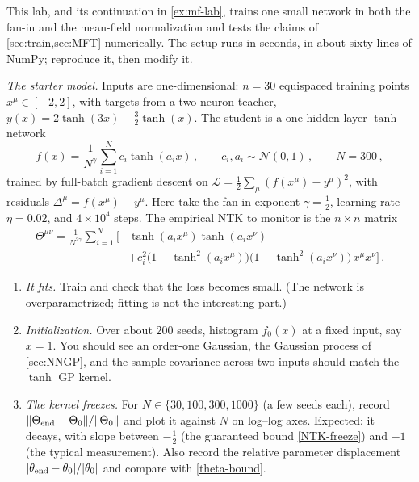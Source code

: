 \documentclass[11pt]{article}
\newcommand{\CN}{{\mathcal N}}
\newcommand{\CL}{{\mathcal L}}
\begin{document}
\begin{exercise}
\label{ex:ntk-lab}
\important
This lab, and its continuation in \cref{ex:mf-lab}, trains one small network in both the fan-in and the mean-field normalization and tests the claims of \cref{sec:train,sec:MFT} numerically. The setup runs in seconds, in about sixty lines of NumPy; reproduce it, then modify it.

\emph{The starter model.} Inputs are one-dimensional: $n=30$ equispaced training points $x^\mu\in[-2,2]$, with targets from a two-neuron teacher, $y(x) = 2\tanh(3x) - \frac{3}{2}\tanh(x)$. The student is a one-hidden-layer $\tanh$ network
%
\begin{equation} \label{lab-student}
    f(x) = \frac{1}{N^\gamma}\sum_{i=1}^N c_i\tanh(a_ix)\,,\qquad c_i,a_i\sim\CN(0,1)\,,\qquad N=300\,,
\end{equation}
%
trained by full-batch gradient descent on $\CL = \frac{1}{2}\sum_\mu(f(x^\mu)-y^\mu)^2$, with residuals $\Delta^\mu = f(x^\mu)-y^\mu$. Here take the fan-in exponent $\gamma = \frac{1}{2}$, learning rate $\eta = 0.02$, and $4\times10^4$ steps. The empirical NTK to monitor is the $n\times n$ matrix
%
\begin{equation} \label{lab-ntk}
    \begin{aligned}
    \Theta^{\mu\nu} = \frac{1}{N^{2\gamma}}\sum_{i=1}^N\Big[&\tanh(a_ix^\mu)\tanh(a_ix^\nu) \\ &+ c_i^2\big(1-\tanh^2(a_ix^\mu)\big)\big(1-\tanh^2(a_ix^\nu)\big)\,x^\mu x^\nu\Big]\,.
    \end{aligned}
\end{equation}
\begin{enumerate}
    \item \emph{It fits.} Train and check that the loss becomes small. (The network is overparametrized; fitting is not the interesting part.)
    \item \emph{Initialization.} Over about $200$ seeds, histogram $f_0(x)$ at a fixed input, say $x=1$. You should see an order-one Gaussian, the Gaussian process of \cref{sec:NNGP}, and the sample covariance across two inputs should match the $\tanh$ GP kernel.
    \item\label{ex:ntk-lab-freeze} \emph{The kernel freezes.} For $N\in\{30,100,300,1000\}$ (a few seeds each), record $\|\Theta_{\rm end}-\Theta_0\|/\|\Theta_0\|$ and plot it against $N$ on log--log axes. Expected: it decays, with slope between $-\frac{1}{2}$ (the guaranteed bound \eqref{NTK-freeze}) and $-1$ (the typical measurement). Also record the relative parameter displacement $|\theta_{\rm end}-\theta_0|/|\theta_0|$ and compare with \eqref{theta-bound}.

\end{enumerate}
\end{exercise}
\end{document}
